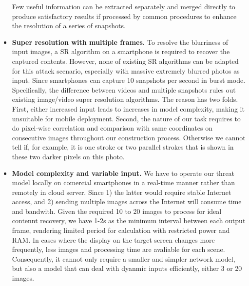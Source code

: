 \begin{itemize}[leftmargin=*]
  Few useful information can be extracted separately and merged directly to produce satisfactory results if processed by common procedures to enhance the resolution of a series of snapshots. 
  \item \textbf{Super resolution with multiple frames.} To resolve the blurriness of input images, a SR algorithm on a smartphone is required to recover the captured contents. However, none of existing SR algorithms can be adapted for this attack scenario, especially with massive extremely blurred photos as input. Since smartphones can capture 10 snapshots per second in burst mode. Specifically, the difference between videos and multiple snapshots rules out existing image/video super resolution algorithms. The reason has two folds. First, either increased input leads to increases in model complexity, making it unsuitable for mobile deployment. Second, the nature of our task requires to do pixel-wise correlation and comparison with same coordinates on consecutive images throughout our construction process. Otherwise we cannot tell if, for example, it is one stroke or two parallel strokes that is shown in these two darker pixels on this photo.
  \item \textbf{Model complexity and variable input.} We have to operate our threat model locally on comercial smartphones in a real-time manner rather than remotely in cloud server. Since 1) the latter would require stable Internet access, and 2) sending multiple images across the Internet will consume time and bandwith. Given the required 10 to 20 images to process for ideal contennt recovery, we have 1-2s as the minimum interval between each output frame, rendering limited period for calculation with restricted power and RAM. In cases where the display on the target screen changes more frequently, less images and processing time are avaliable for each scene. Consequently, it cannot only require a smaller and simpler network model, but also a model that can deal with dyanmic inputs efficiently, either 3 or 20 images.

\end{itemize}
